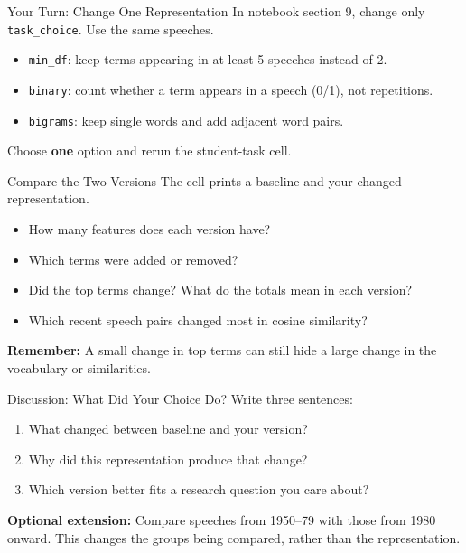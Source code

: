 \documentclass[11pt,aspectratio=43]{beamer}
\begin{document}
\begin{frame}{Your Turn: Change One Representation}
In notebook section 9, change only \texttt{task\_choice}. Use the same speeches.
\vspace{0.6em}
\begin{itemize}
\item \texttt{min\_df}: keep terms appearing in at least 5 speeches instead of 2.
\item \texttt{binary}: count whether a term appears in a speech (0/1), not repetitions.
\item \texttt{bigrams}: keep single words and add adjacent word pairs.
\end{itemize}
\vspace{0.5em}
Choose \textbf{one} option and rerun the student-task cell.
\end{frame}

\begin{frame}{Compare the Two Versions}
The cell prints a baseline and your changed representation.
\begin{itemize}
\item How many features does each version have?
\item Which terms were added or removed?
\item Did the top terms change? What do the totals mean in each version?
\item Which recent speech pairs changed most in cosine similarity?
\end{itemize}
\vspace{0.5em}
\textbf{Remember:} A small change in top terms can still hide a large change in the vocabulary or similarities.
\end{frame}

\begin{frame}{Discussion: What Did Your Choice Do?}
Write three sentences:
\begin{enumerate}
\item What changed between baseline and your version?
\item Why did this representation produce that change?
\item Which version better fits a research question you care about?
\end{enumerate}
\vspace{0.8em}
\textbf{Optional extension:} Compare speeches from 1950--79 with those from 1980 onward. This changes the groups being compared, rather than the representation.
\end{frame}
\end{document}
